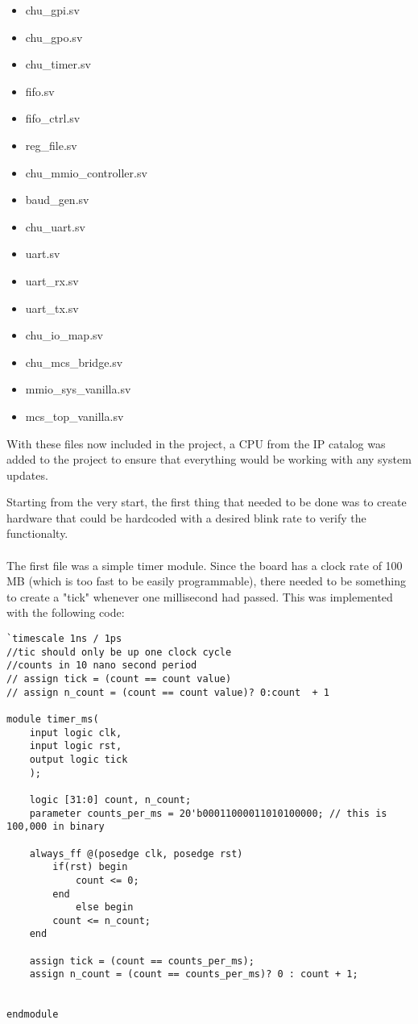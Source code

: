 \documentclass[11pt]{article}
\begin{document}
\begin{multicols}{2}
\begin{itemize}
	\item chu\_gpi.sv
	\item chu\_gpo.sv 
	\item chu\_timer.sv 
	\item fifo.sv 
	\item fifo\_ctrl.sv 
	\item reg\_file.sv
	\item chu\_mmio\_controller.sv 
	\item baud\_gen.sv 
	\item chu\_uart.sv 
	\item uart.sv 
	\item uart\_rx.sv 
	\item uart\_tx.sv 
	\item chu\_io\_map.sv 
	\item chu\_mcs\_bridge.sv 
	\item mmio\_sys\_vanilla.sv 
	\item mcs\_top\_vanilla.sv
\end{itemize}
\end{multicols} 

\quad With these files now included in the project, a CPU from the IP catalog was added to the project to ensure that everything would be working with any system updates.

\quad Starting from the very start, the first thing that needed to be done was to create hardware that could be hardcoded with a desired blink rate to verify the functionalty. \\\\

\quad The first file was a simple timer module. Since the board has a clock rate of 100 MB (which is too fast to be easily programmable), there needed to be something to create a "tick" whenever one millisecond had passed. This was implemented with the following code: 

\begin{lstlisting}[style=Verilog,caption=Millisecond Timer Module Code,label=code:ex ]
`timescale 1ns / 1ps
//tic should only be up one clock cycle
//counts in 10 nano second period 
// assign tick = (count == count value) 
// assign n_count = (count == count value)? 0:count  + 1

module timer_ms(
	input logic clk,
	input logic rst,
	output logic tick
	);
	
	logic [31:0] count, n_count; 
	parameter counts_per_ms = 20'b00011000011010100000; // this is 100,000 in binary 
	
	always_ff @(posedge clk, posedge rst)
		if(rst) begin
			count <= 0; 
		end
			else begin
		count <= n_count;
	end
	
	assign tick = (count == counts_per_ms); 
	assign n_count = (count == counts_per_ms)? 0 : count + 1; 


endmodule
\end{lstlisting}
\end{document}
